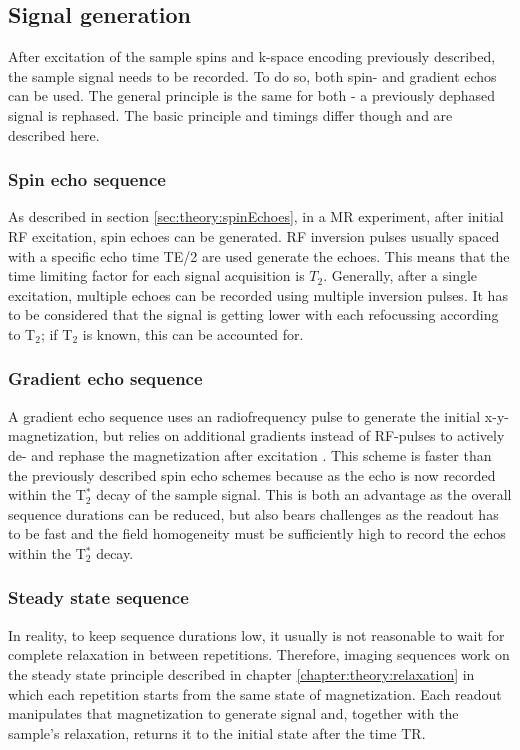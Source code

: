         \subsection{Signal generation}
        After excitation of the sample spins and k-space encoding previously described, the sample signal needs to be recorded. To do so, both spin- and gradient echos can be used. The general principle is the same for both - a previously dephased signal is rephased. The basic principle and timings differ though and are described here. 
        \subsubsection{Spin echo sequence}
            As described in section \ref{sec:theory:spinEchoes}, in a MR experiment, after initial RF excitation, spin echoes can be generated. RF inversion pulses usually spaced with a specific echo time TE/2 are used generate the echoes. This means that the time limiting factor for each signal acquisition is $T_2$. Generally, after a single excitation, multiple echoes can be recorded using multiple inversion pulses. It has to be considered that the signal is getting lower with each refocussing according to T$_2$; if T$_2$ is known, this can be accounted for.
        \subsubsection{Gradient echo sequence}
        \label{sec:theory:gradientEcho}
        A gradient echo sequence uses an radiofrequency pulse to generate the initial x-y-magnetization, but relies on additional gradients instead of RF-pulses to actively de- and rephase the magnetization after excitation \cite{brown_mri_2005}. This scheme is faster than the previously described spin echo schemes because as the echo is now recorded within the T$_2^*$ decay of the sample signal. This is both an advantage as the overall sequence durations can be reduced, but also bears challenges as the readout has to be fast and the field homogeneity must be sufficiently high to record the echos within the T$_2^*$ decay.
        \subsubsection{Steady state sequence}
        In reality, to keep sequence durations low, it usually is not reasonable to wait for complete relaxation in between repetitions. Therefore, imaging sequences work on the steady state principle described in chapter \ref{chapter:theory:relaxation} in which each repetition starts from the same state of magnetization. Each readout manipulates that magnetization to generate signal and, together with the sample's relaxation, returns it to the initial state after the time TR. 
